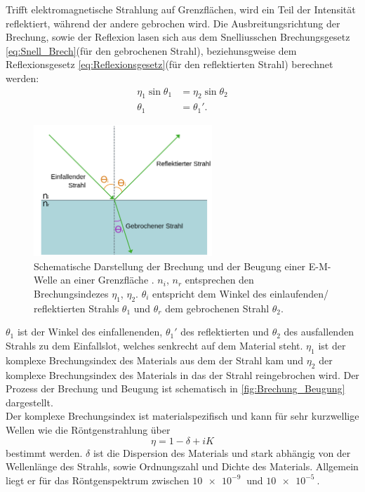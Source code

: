 Trifft elektromagnetische Strahlung auf Grenzflächen, wird ein Teil der Intensität reflektiert, während der andere gebrochen wird. Die Ausbreitungsrichtung der Brechung,
sowie der Reflexion lasen sich aus dem Snelliusschen Brechungsgesetz \autoref{eq:Snell_Brech}(für den gebrochenen Strahl), beziehunsgweise dem Reflexionsgesetz \autoref{eq:Reflexionsgesetz}(für den reflektierten Strahl) berechnet werden:
\begin{align}
\label{eq:Snell_Brech}
    \eta_1 \sin{\theta_1} &= \eta_2 \sin{\theta_2}\\
\label{eq:Reflexionsgesetz}
    \theta_1 &= \theta_1'.
\end{align}
\begin{figure}[H]
    \centering
    \includegraphics[width = 0.6\textwidth]{bilder/Brechung_Beugung.png}
    \caption{Schematische Darstellung der Brechung und der Beugung einer E-M-Welle an einer Grenzfläche \cite{Labster}. $n_i$,
    $n_r$ entsprechen den Brechungsindezes $\eta_1$, $\eta_2$. $\theta_i$ entspricht dem Winkel des einlaufenden/ reflektierten Strahls $\theta_1$ und $\theta_r$ dem gebrochenen Strahl $\theta_2$.}
    \label{fig:Brechung_Beugung}
\end{figure}
$\theta_1$ ist der Winkel des einfallenenden, $\theta_1'$ des reflektierten und $\theta_2$ des ausfallenden Strahls zu dem Einfallslot, welches senkrecht auf dem Material steht. $\eta_1$ ist der komplexe Brechungsindex des Materials aus dem der Strahl kam und
$\eta_2$ der komplexe Brechungsindex des Materials in das der Strahl reingebrochen wird. Der Prozess der Brechung und Beugung ist schematisch in \autoref{fig:Brechung_Beugung} dargestellt.\\
Der komplexe Brechungsindex ist materialspezifisch und kann für sehr kurzwellige Wellen wie die Röntgenstrahlung über
\begin{equation}
    \label{eq:Brechungsindex}
    \eta = 1-\delta+iK
\end{equation}
bestimmt werden. $\delta$ ist die Dispersion des Materials und stark abhängig von der Wellenlänge des Strahls, sowie Ordnungszahl und Dichte des Materials. Allgemein liegt er für das Röntgenspektrum zwischen $\qty{10e-9}{}$ und $\qty{10e-5}{}$.
